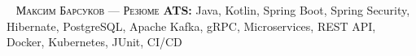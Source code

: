
\makecvfooterwithkeywords
   {\textsc{\russiancurrentmonth \ \the\year{}}}
   {\textsc{Максим Барсуков --- Резюме}}
   {\thepage}
   {\textbf{ATS:} Java, Kotlin, Spring Boot, Spring Security, Hibernate, PostgreSQL, Apache Kafka, gRPC, Microservices, REST API, Docker, Kubernetes, JUnit, CI/CD}
